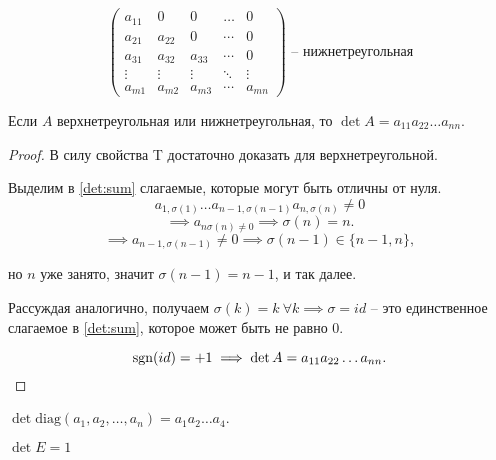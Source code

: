 \begin{equation*}
    \begin{pmatrix}
        a_{11} & 0 & 0 & \dots & 0 \\
        a_{21} & a_{22} & 0 & \cdots & 0 \\
        a_{31} & a_{32} & a_{33} & \cdots & 0 \\
        \vdots & \vdots & \vdots & \ddots & \vdots \\
        a_{m1} & a_{m2} & a_{m3} & \cdots & a_{mn}
    \end{pmatrix} \text{ -- нижнетреугольная}
\end{equation*}

\begin{comment}
    Всякая ступенчатая квадратная матрица верхнетреугольна.
\end{comment}

\begin{description}[resume]
\item[Свойство 6]
    Если $A$ верхнетреугольная или нижнетреугольная, то $\det A = a_{11} a_{22} \dots a_{nn}$.

    \begin{proof}
        В силу свойства T достаточно доказать для верхнетреугольной.

        Выделим в \eqref{det:sum} слагаемые, которые могут быть отличны от нуля.
        \begin{equation*}
            a_{1, \sigma(1)} \dots a_{n - 1, \sigma(n - 1)} a_{n, \sigma(n)} \neq 0
        \end{equation*}
        \begin{equation*}
            \implies a_{n\sigma(n) \neq 0} \implies \sigma(n) = n
        .\end{equation*}
        \begin{equation*}
            \implies a_{n - 1, \sigma(n - 1)} \neq 0 \implies \sigma(n - 1) \in \{n - 1, n\},
        \end{equation*}

        но $n$ уже занято, значит $\sigma(n - 1) = n - 1$, и так далее.

        Рассуждая аналогично, получаем $\sigma(k) = k \ \forall k \implies \sigma = id$ -- это единственное слагаемое в \eqref{det:sum}, которое может быть не равно 0.

        \begin{equation*}
            \operatorname{\mathop{\mathrm{sgn}}}(id) = +1 \implies \det A = a_{11} a_{22} \dots a_{nn}
        .\end{equation*}
    \end{proof}

    \begin{corollary}
        $\det \text{diag}(a_1, a_2, \dots, a_n) = a_1 a_2 \dots a_4$.
    \end{corollary}

    \begin{corollary}
        $\det E = 1$
    \end{corollary}
\end{description}



